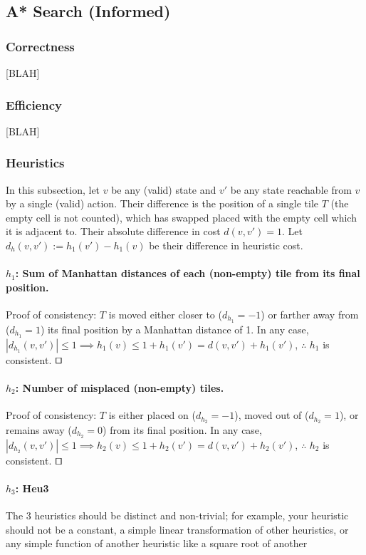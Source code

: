 \documentclass[runningheads]{llncs}
\begin{document}
\subsection{A* Search (Informed)}
\subsubsection{Correctness}
[BLAH]

\subsubsection{Efficiency}
[BLAH]

\subsubsection{Heuristics}
In this subsection, let $v$ be any (valid) state and $v'$ be any state reachable from $v$ by a single (valid) action. Their difference is the position of a single tile $T$ (the empty cell is not counted), which has swapped placed with the empty cell which it is adjacent to. Their absolute difference in cost $d(v,v') = 1$. Let $d_h(v,v') := h_1(v')-h_1(v)$ be their difference in heuristic cost.

\paragraph{$h_1$: Sum of Manhattan distances of each (non-empty) tile from its final position.}
Proof of consistency: $T$ is moved either closer to ($d_{h_1} = -1$) or farther away from ($d_{h_1} = 1$) its final position by a Manhattan distance of 1.
In any case, $|d_{h_1}(v,v')|\leq 1 \implies h_1(v) \leq 1+h_1(v') = d(v,v')+h_1(v')$, $\therefore$ $h_1$ is consistent. $\qed$

\paragraph{$h_2$: Number of misplaced (non-empty) tiles.}
Proof of consistency: $T$ is either placed on ($d_{h_2} = -1$), moved out of ($d_{h_2} = 1$), or remains away ($d_{h_2} = 0$) from its final position.
In any case, $|d_{h_2}(v,v')|\leq 1 \implies h_2(v) \leq 1+h_2(v') = d(v,v')+h_2(v')$, $\therefore$ $h_2$ is consistent. $\qed$

\paragraph{$h_3$: Heu3}
The 3 heuristics should be distinct and non-trivial; for example, your heuristic should not be a constant, a simple linear transformation of other heuristics, or any simple function of another heuristic like a square root of another
\end{document}
